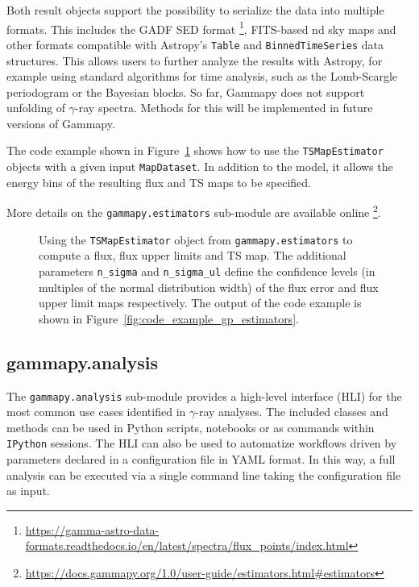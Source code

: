 \documentclass[longauth]{aa}
\newcommand{\code}[1]{\texttt{#1}}
\newcommand{\gammapy}{Gammapy\xspace}
\newcommand{\gammaray}{$\gamma$-ray\xspace}
\newcommand{\gadf}{GADF\xspace}
\begin{document}
Both result objects support the possibility to serialize
the data into multiple formats. This includes the
\gadf SED format \footnote{\url{https://gamma-astro-data-formats.readthedocs.io/en/latest/spectra/flux_points/index.html}},
FITS-based nd sky maps and other formats compatible with Astropy's \code{Table} and
\code{BinnedTimeSeries} data structures. This allows
users to further analyze the results with Astropy, for example using
standard algorithms for time analysis, such as
the Lomb-Scargle periodogram or the Bayesian
blocks. So far, \gammapy does not support unfolding of \gammaray spectra.
Methods for this will be implemented in future versions of \gammapy.

The code example shown in Figure~\ref{fig*:minted:gp_estimators} shows how to use
the \code{TSMapEstimator} objects with a given input \code{MapDataset}.
In addition to the model, it allows the energy
bins of the resulting flux and TS maps to be specified.

More details on the \code{gammapy.estimators} sub-module are available online \footnote{\url{https://docs.gammapy.org/1.0/user-guide/estimators.html\#estimators}}.

\begin{figure}
        \small
        \caption{Using the \code{TSMapEstimator} object from \code{gammapy.estimators} to compute a
         flux, flux upper limits and TS map. The additional parameters \code{n\_sigma}
        and \code{n\_sigma\_ul} define the confidence levels (in multiples of the normal distribution width)
        of the flux error and flux upper limit maps respectively. The output
                of the code example is shown in Figure~\ref{fig:code_example_gp_estimators}.
    }
    \label{fig*:minted:gp_estimators}
\end{figure}

\subsection{gammapy.analysis}
\label{ssec:gammapy-analysis}
The \code{gammapy.analysis} sub-module provides a high-level interface (HLI) for the most
common use cases identified in \gammaray analyses. The included classes and methods
 can be used in Python scripts, notebooks or as commands within \texttt{IPython}
sessions. The HLI can also be used to automatize
workflows driven by parameters declared in a configuration file in YAML format.
In this way, a full analysis can be executed via a single command line taking the
configuration file as input.
\end{document}
